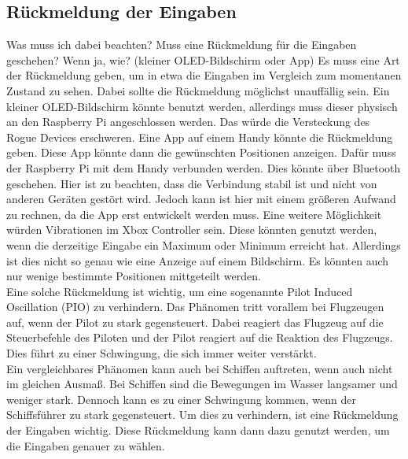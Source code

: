 \subsection{Rückmeldung der Eingaben}
Was muss ich dabei beachten?
Muss eine Rückmeldung für die Eingaben geschehen? Wenn ja, wie?
(kleiner OLED-Bildschirm oder App)
Es muss eine Art der Rückmeldung geben, um in etwa die Eingaben im Vergleich zum momentanen Zustand zu sehen.
Dabei sollte die Rückmeldung möglichst unauffällig sein. Ein kleiner OLED-Bildschirm könnte benutzt werden, allerdings
muss dieser physisch an den Raspberry Pi angeschlossen werden. Das würde die Versteckung des Rogue Devices erschweren.
Eine App auf einem Handy könnte die Rückmeldung geben. Diese App könnte dann die gewünschten Positionen anzeigen.
Dafür muss der Raspberry Pi mit dem Handy verbunden werden. Dies könnte über Bluetooth geschehen.
Hier ist zu beachten, dass die Verbindung stabil ist und nicht von anderen Geräten gestört wird.
Jedoch kann ist hier mit einem größeren Aufwand zu rechnen, da die App erst entwickelt werden muss.
Eine weitere Möglichkeit würden Vibrationen im Xbox Controller sein. Diese könnten genutzt werden, wenn die derzeitige
Eingabe ein Maximum oder Minimum erreicht hat. Allerdings ist dies nicht so genau wie eine Anzeige auf einem Bildschirm.
Es könnten auch nur wenige bestimmte Positionen mittgeteilt werden. \\
Eine solche Rückmeldung ist wichtig, um eine sogenannte Pilot Induced Oscillation (PIO) zu verhindern. Das Phänomen tritt
vorallem bei Flugzeugen auf, wenn der Pilot zu stark gegensteuert. Dabei reagiert das Flugzeug auf die Steuerbefehle
des Piloten und der Pilot reagiert auf die Reaktion des Flugzeugs. Dies führt zu einer Schwingung, die sich immer weiter
verstärkt. \cite{McRuer1995} \\
Ein vergleichbares Phänomen kann auch bei Schiffen auftreten, wenn auch nicht im gleichen Ausmaß. Bei Schiffen 
sind die Bewegungen im Wasser langsamer und weniger stark. Dennoch kann es zu einer Schwingung kommen, wenn der Schiffsführer
zu stark gegensteuert. Um dies zu verhindern, ist eine Rückmeldung der Eingaben wichtig. Diese Rückmeldung kann dann
dazu genutzt werden, um die Eingaben genauer zu wählen.